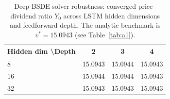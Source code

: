 \begin{table}[htbp]
\centering
\caption{Deep BSDE solver robustness: converged price--dividend ratio $Y_0$ across LSTM hidden dimensions and feedforward depth. The analytic benchmark is $v^*=15.0943$ (see Table~\ref{tab:a1}).}
\label{tab:grid}
\begin{tabular}{lccc}
\toprule
Hidden dim \textbackslash Depth & 2 & 3 & 4 \\
\midrule
8 & 15.0943 & 15.0944 & 15.0943 \\
16 & 15.0944 & 15.0944 & 15.0943 \\
32 & 15.0943 & 15.0943 & 15.0943 \\
\bottomrule
\end{tabular}
\end{table}
